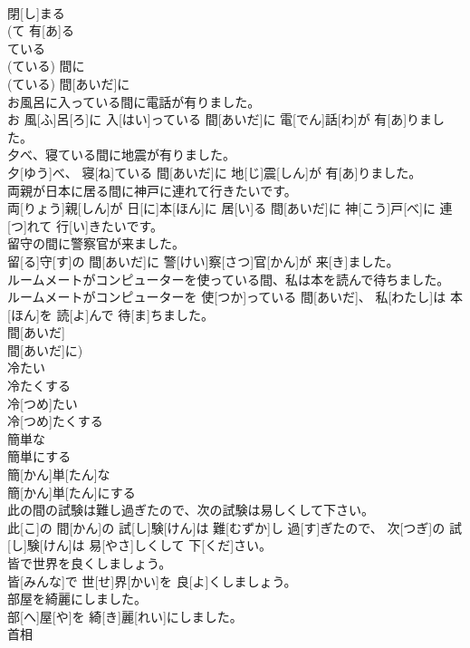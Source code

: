 \documentclass[8pt]{extreport}
\begin{document}
\begin{CJK}{UTF8}{min}
\\	閉[し]まる 
\\	(て 有[あ]る 
\\	ている 
\\	(ている) 間に 
\\	(ている) 間[あいだ]に 
\\	お風呂に入っている間に電話が有りました。	
\\	お 風[ふ]呂[ろ]に 入[はい]っている 間[あいだ]に 電[でん]話[わ]が 有[あ]りました。
\\	夕べ、寝ている間に地震が有りました。	
\\	夕[ゆう]べ、 寝[ね]ている 間[あいだ]に 地[じ]震[しん]が 有[あ]りました。
\\	両親が日本に居る間に神戸に連れて行きたいです。	
\\	両[りょう]親[しん]が 日[に]本[ほん]に 居[い]る 間[あいだ]に 神[こう]戸[べ]に 連[つ]れて 行[い]きたいです。
\\	留守の間に警察官が来ました。	
\\	留[る]守[す]の 間[あいだ]に 警[けい]察[さつ]官[かん]が 来[き]ました。
\\	ルームメートがコンピューターを使っている間、私は本を読んで待ちました。	
\\	ルームメートがコンピューターを 使[つか]っている 間[あいだ]、 私[わたし]は 本[ほん]を 読[よ]んで 待[ま]ちました。 
\\	間[あいだ] 
\\	間[あいだ]に)
\\	冷たい 
\\	冷たくする	
\\	冷[つめ]たい 
\\	冷[つめ]たくする
\\	簡単な 
\\	簡単にする	
\\	簡[かん]単[たん]な 
\\	簡[かん]単[たん]にする
\\	此の間の試験は難し過ぎたので、次の試験は易しくして下さい。	
\\	此[こ]の 間[かん]の 試[し]験[けん]は 難[むずか]し 過[す]ぎたので、 次[つぎ]の 試[し]験[けん]は 易[やさ]しくして 下[くだ]さい。
\\	皆で世界を良くしましょう。	
\\	皆[みんな]で 世[せ]界[かい]を 良[よ]くしましょう。
\\	部屋を綺麗にしました。	
\\	部[へ]屋[や]を 綺[き]麗[れい]にしました。
\\	首相	

\end{CJK}
\end{document}
